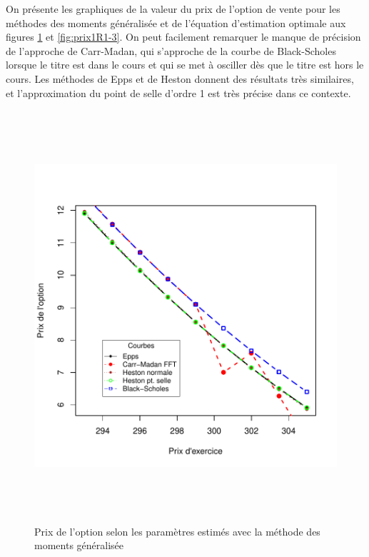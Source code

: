 On présente les graphiques de la valeur du prix de l'option de vente
pour les méthodes des moments généralisée et de l'équation d'estimation
optimale aux figures \ref{fig:prix1R1-1} et \ref{fig:prix1R1-3}.  On
peut facilement remarquer le manque de précision de l'approche de
Carr-Madan, qui s'approche de la courbe de Black-Scholes lorsque le
titre est dans le cours et qui se met à osciller dès que le titre
est hors le cours. Les méthodes de Epps et de Heston donnent des
résultats très similaires, et l'approximation du point de selle
d'ordre 1 est très précise dans ce contexte.
\begin{figure}[!ht]
  \centering
  \includegraphics[height=6in,
  width=6in]{./graphiques/ABBEYN-callGAL-7.pdf}
  \caption{Prix de l'option selon les paramètres estimés avec la
    méthode des moments généralisée}
  \label{fig:prix1R1-1}
\end{figure}

